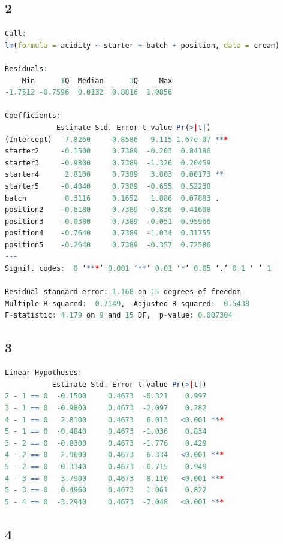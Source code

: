 \documentclass{article}
\begin{document}
    \subsection*{2}
      \begin{lstlisting}[language=R]
Call:
lm(formula = acidity ~ starter + batch + position, data = cream)

Residuals:
    Min      1Q  Median      3Q     Max 
-1.7512 -0.7596  0.0132  0.8816  1.0856 

Coefficients:
            Estimate Std. Error t value Pr(>|t|)    
(Intercept)   7.8260     0.8586   9.115 1.67e-07 ***
starter2     -0.1500     0.7389  -0.203  0.84186    
starter3     -0.9800     0.7389  -1.326  0.20459    
starter4      2.8100     0.7389   3.803  0.00173 ** 
starter5     -0.4840     0.7389  -0.655  0.52238    
batch         0.3116     0.1652   1.886  0.07883 .  
position2    -0.6180     0.7389  -0.836  0.41608    
position3    -0.0380     0.7389  -0.051  0.95966    
position4    -0.7640     0.7389  -1.034  0.31755    
position5    -0.2640     0.7389  -0.357  0.72586    
---
Signif. codes:  0 ‘***’ 0.001 ‘**’ 0.01 ‘*’ 0.05 ‘.’ 0.1 ‘ ’ 1

Residual standard error: 1.168 on 15 degrees of freedom
Multiple R-squared:  0.7149,  Adjusted R-squared:  0.5438 
F-statistic: 4.179 on 9 and 15 DF,  p-value: 0.007304
      \end{lstlisting}
    
    \subsection*{3}
      \begin{lstlisting}[language=R]
Linear Hypotheses:
           Estimate Std. Error t value Pr(>|t|)    
2 - 1 == 0  -0.1500     0.4673  -0.321    0.997    
3 - 1 == 0  -0.9800     0.4673  -2.097    0.282    
4 - 1 == 0   2.8100     0.4673   6.013   <0.001 ***
5 - 1 == 0  -0.4840     0.4673  -1.036    0.834    
3 - 2 == 0  -0.8300     0.4673  -1.776    0.429    
4 - 2 == 0   2.9600     0.4673   6.334   <0.001 ***
5 - 2 == 0  -0.3340     0.4673  -0.715    0.949    
4 - 3 == 0   3.7900     0.4673   8.110   <0.001 ***
5 - 3 == 0   0.4960     0.4673   1.061    0.822    
5 - 4 == 0  -3.2940     0.4673  -7.048   <0.001 ***
      \end{lstlisting}
    
    \subsection*{4}
    
\end{document}
